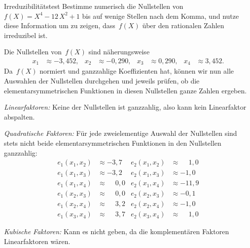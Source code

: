 \documentclass{algblatt}
\begin{document}
\vspace*{-1.5cm}

\begin{aufgabe}{Irreduzibilitätstest}
Bestimme numerisch die Nullstellen von~$f(X) = X^4 - 12\,X^2 + 1$ bis auf
wenige Stellen nach dem Komma, und nutze diese Information um zu zeigen,
dass~$f(X)$ über den rationalen Zahlen irreduzibel ist.

\begin{loesung}
Die Nullstellen von~$f(X)$ sind näherungsweise
\begin{align*}
  x_1 &\approx -3{,}452, &
  x_2 &\approx -0{,}290, &
  x_3 &\approx 0{,}290, &
  x_4 &\approx 3{,}452.
\end{align*}
Da~$f(X)$ normiert und ganzzahlige Koeffizienten hat, können wir nun alle
Auswahlen der Nullstellen durchgehen und jeweils prüfen, ob die
elementarsymmetrischen Funktionen in diesen Nullstellen ganze Zahlen ergeben.

\emph{Linearfaktoren:} Keine der Nullstellen ist ganzzahlig, also kann kein
Linearfaktor abspalten.

\emph{Quadratische Faktoren:} Für jede zweielementige Auswahl der Nullstellen
sind stets nicht beide elementarsymmetrischen Funktionen in den Nullstellen
ganzzahlig:
\begin{align*}
  e_1(x_1,x_2) &\approx -3{,}7 &
  e_2(x_1,x_2) &\approx \phantom{+}1{,}0 \\
  e_1(x_1,x_3) &\approx -3{,}2 &
  e_2(x_1,x_3) &\approx -1{,}0 \\
  e_1(x_1,x_4) &\approx \phantom{+}0{,}0 &
  e_2(x_1,x_4) &\approx -11{,}9 \\
  e_1(x_2,x_3) &\approx \phantom{+}0{,}0 &
  e_2(x_2,x_3) &\approx -0{,}1 \\
  e_1(x_2,x_4) &\approx \phantom{+}3{,}2 &
  e_2(x_2,x_4) &\approx -1{,}0 \\
  e_1(x_3,x_4) &\approx \phantom{+}3{,}7 &
  e_2(x_3,x_4) &\approx \phantom{+}1{,}0
\end{align*}

\emph{Kubische Faktoren:} Kann es nicht geben, da die komplementären Faktoren
Linearfaktoren wären.
\end{loesung}
\end{aufgabe}
\end{document}
